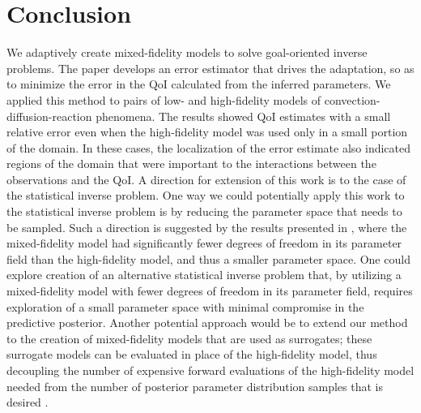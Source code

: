 \section{Conclusion}\label{sec:conc}

We adaptively create mixed-fidelity models to solve goal-oriented inverse problems. The paper develops an error estimator that drives the adaptation, so as to minimize the error in the QoI calculated from the inferred parameters. We applied this method to pairs of low- and high-fidelity models of convection-diffusion-reaction phenomena. The results showed QoI estimates with a small relative error even when the high-fidelity model was used only in a small portion of the domain. In these cases, the localization of the error estimate also indicated regions of the domain that were important to the interactions between the observations and the QoI. A direction for extension of this work is to the case of the statistical inverse problem.  One way we could potentially apply this work to the statistical inverse problem is by reducing the parameter space that needs to be sampled. Such a direction is suggested by the results presented in , where the mixed-fidelity model had significantly fewer degrees of freedom in its parameter field than the high-fidelity model, and thus a smaller parameter space. One could explore creation of an alternative statistical inverse problem that, by utilizing a mixed-fidelity model with fewer degrees of freedom in its parameter field, requires exploration of a small parameter space with minimal compromise in the predictive posterior.
Another potential approach would be to extend our method to the creation of mixed-fidelity models that are used as surrogates; these surrogate models can be evaluated in place of the high-fidelity model, thus decoupling the number of expensive forward evaluations of the high-fidelity model needed from the number of posterior parameter distribution samples that is desired \cite{Con14}.

